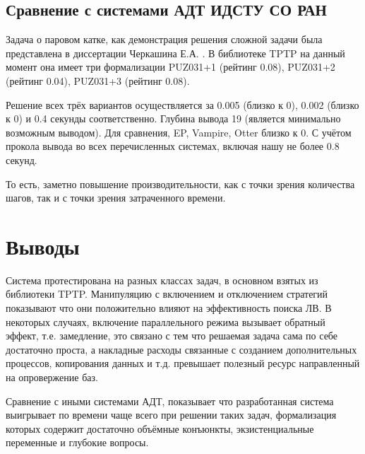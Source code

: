 \subsection{Сравнение с системами АДТ ИДСТУ СО РАН}
Задача о паровом катке, как демонстрация решения сложной задачи была представлена в диссертации Черкашина Е.А. \cite{dissChe}.
В библиотеке TPTP на данный момент она имеет три формализации PUZ031+1 (рейтинг 0.08), PUZ031+2 (рейтинг 0.04), PUZ031+3 (рейтинг 0.08).

Решение всех трёх вариантов осуществляется за 0.005 (близко к 0), 0.002 (близко к 0) и 0.4 секунды соответственно. Глубина вывода 19 (является минимально возможным выводом). Для сравнения, EP, Vampire, Otter близко к 0. С учётом прокола вывода во всех перечисленных системах, включая нашу не более 0.8 секунд.

То есть, заметно повышение производительности, как с точки зрения количества шагов, так и с точки зрения затраченного времени.




\section{Выводы}
Система протестирована на разных классах задач, в основном взятых из библиотеки TPTP. Манипуляцию с включением и отключением стратегий показывают что они положительно влияют на эффективность поиска ЛВ. В некоторых случаях, включение параллельного режима вызывает обратный эффект, т.е. замедление, это связано с тем что решаемая задача сама по себе достаточно проста, а  накладные расходы связанные с созданием дополнительных процессов, копирования данных и т.д. превышает полезный ресурс направленный на опровержение баз.

Сравнение с иными системами АДТ, показывает что разработанная система выигрывает по времени чаще всего при решении таких задач, формализация которых содержит достаточно объёмные конъюнкты, экзистенциальные переменные и глубокие вопросы.

